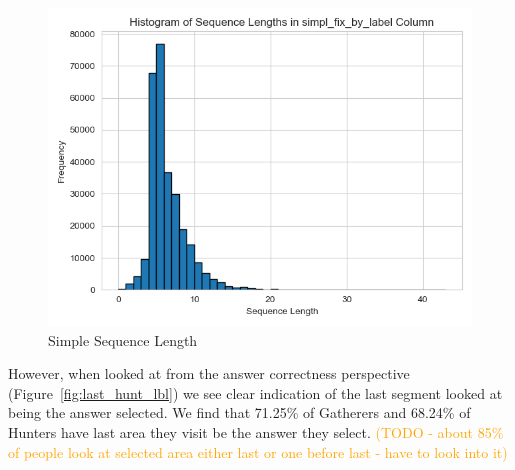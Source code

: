 \documentclass[manuscript,review,anonymous]{acmart}
\begin{document}
    \begin{figure}[htbp]
        \centering
        \includegraphics[width=0.75\linewidth]{plots/sequence_freq/simpl_fix_by_label.png}
        \caption{Simple Sequence Length}
        \label{fig:length}
    \end{figure}

    However, when looked at from the answer correctness perspective (Figure~\ref{fig:last_hunt_lbl}) we see clear indication of the last segment looked at being the answer selected. We find that 71.25\% of Gatherers and 68.24\% of Hunters have last area they visit be the answer they select. \textcolor{orange}{(TODO  - about 85\% of people look at selected area either last or one before last - have to look into it)} 
\end{document}

